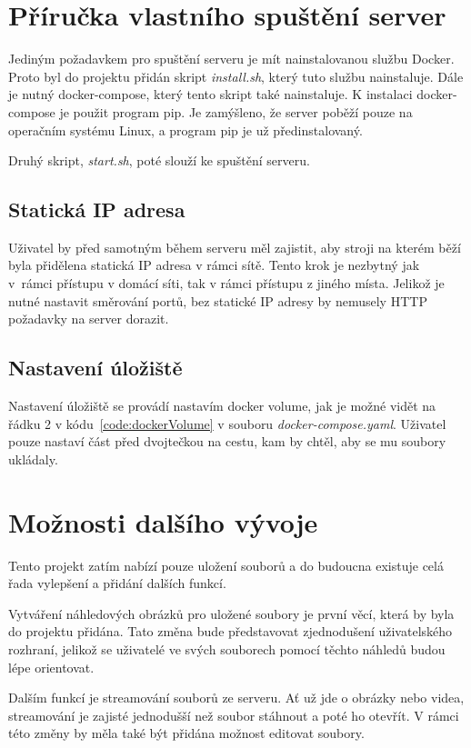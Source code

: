 \documentclass[
  glossaries,
]{kidiplom}
\begin{document}
\section{Příručka vlastního spuštění server}
Jediným požadavkem pro spuštění serveru je mít nainstalovanou službu Docker. Proto byl do projektu přidán skript \textit{install.sh}, který tuto službu nainstaluje. Dále je nutný docker-compose, který tento skript také nainstaluje. K instalaci docker-compose je použit program pip. Je zamýšleno, že server poběží pouze na operačním systému Linux, a program pip je už předinstalovaný.

Druhý skript, \textit{start.sh}, poté slouží ke spuštění serveru.

\subsection{Statická IP adresa}
Uživatel by před samotným během serveru měl zajistit, aby stroji na kterém běží byla přidělena statická IP adresa v rámci sítě. Tento krok je nezbytný jak v~rámci přístupu v domácí síti, tak v rámci přístupu z jiného místa. Jelikož je nutné nastavit směrování portů, bez statické IP adresy by nemusely HTTP požadavky na server dorazit.

\subsection{Nastavení úložiště}
Nastavení úložiště se provádí nastavím docker volume, jak je možné vidět na řádku 2 v kódu~\ref{code:dockerVolume} v souboru \textit{docker-compose.yaml}. Uživatel pouze nastaví část před dvojtečkou na cestu, kam by chtěl, aby se mu soubory ukládaly.
\clearpage
\section{Možnosti dalšího vývoje}
Tento projekt zatím nabízí pouze uložení souborů a do budoucna existuje celá řada vylepšení a přidání dalších funkcí. 

Vytváření náhledových obrázků pro uložené soubory je první věcí, která by byla do projektu přidána. Tato změna bude představovat zjednodušení uživatelského rozhraní, jelikož se uživatelé ve svých souborech pomocí těchto náhledů budou lépe orientovat.

Dalším funkcí je streamování souborů ze serveru. Ať už jde o obrázky nebo videa, streamování je zajisté jednodušší než soubor stáhnout a poté ho otevřít. V rámci této změny by měla také být přidána možnost editovat soubory.
\end{document}
